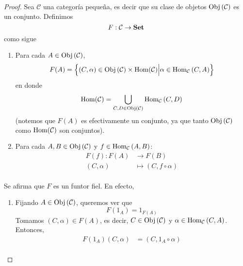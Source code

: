 \documentclass[12pt]{report}
\newcounter{it}
\theoremstyle{largebreak}
\newcommand{\Obj}[1]{\ensuremath{\textup{Obj}\left(#1\right)}}
\newcommand{\Hom}[3]{\ensuremath{\textup{Hom}_{#1}\left(#2,#3\right)}}
\newcommand{\Cat}[1]{\ensuremath{\textup{\textbf{#1}}}}
\begin{document}
    \begin{proof}
        Sea $\mathcal{C}$ una categoría pequeña, es decir que su clase de objetos $\Obj{\mathcal{C}}$ es un conjunto. Definimos
        \begin{equation*}
            F:\mathcal{C}\rightarrow\Cat{Set}
        \end{equation*}
        como sigue
        \begin{enumerate}
            \item Para cada $A\in\Obj{\mathcal{C}}$,
            \begin{equation*}
                F(A)=\left\{(C,\alpha)\in\Obj{\mathcal{C}}\times\textup{Hom}(\mathcal{C}) \Big|\alpha\in\Hom{\mathcal{C}}{C}{A}  \right\}
            \end{equation*}
            en donde
            \begin{equation*}
                \textup{Hom}(\mathcal{C})=\bigcup_{ C,D\in\Obj{\mathcal{C}}}\Hom{\mathcal{C}}{C}{D}
            \end{equation*}
            (notemos que $F(A)$ es efectivamente un conjunto, ya que tanto $\Obj{\mathcal{C}}$ como $\textup{Hom}(\mathcal{C})$ son conjuntos).
            \item Para cada $A,B\in\Obj{\mathcal{C}}$ y $f\in\Hom{\mathcal{C}}{A}{B}$:
            \begin{equation*}
                \begin{split}
                    F(f):F(A)&\rightarrow F(B)\\
                    (C,\alpha)&\mapsto (C,f\circ \alpha)\\
                \end{split}
            \end{equation*}
        \end{enumerate}
        Se afirma que $F$ es un funtor fiel. En efecto,
        \renewcommand{\theenumi}{\roman{enumi}}
        \begin{enumerate}
            \item Fijando $A\in\Obj{\mathcal{C}}$, queremos ver que
            \begin{equation*}
                F(1_A)=1_{F(A)}
            \end{equation*}
            Tomamos $(C,\alpha)\in F(A)$, es decir, $C\in\Obj{\mathcal{C}}$ y $\alpha\in\Hom{\mathcal{C}}{C}{A}$. Entonces,
            \begin{equation*}
                \begin{split}
                    F(1_A)(C,\alpha)&=(C,1_A\circ\alpha)\\

\end{split}
\end{equation*}
\end{enumerate}
\end{proof}
\end{document}
